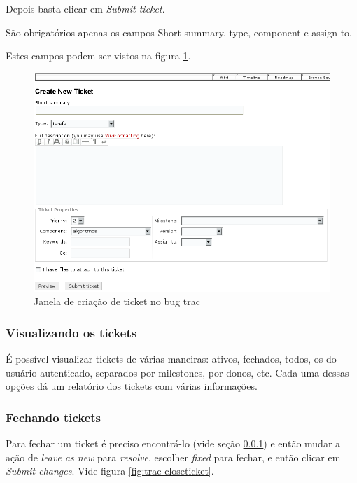 \documentclass[12pt,brazil]{book}
\newcommand{\eng}[1]{\textit{#1}}
\begin{document}
Depois basta clicar em \eng{Submit ticket}.

São obrigatórios apenas os campos Short summary, type, component e
assign to.

Estes campos podem ser vistos na figura \ref{fig:trac-newticket}.

\begin{figure}
  \centering
  \includegraphics[scale=.7]{trac-newticket}
  \caption{Janela de criação de ticket no bug trac}
  \label{fig:trac-newticket}
\end{figure}

\subsubsection{Visualizando os tickets}
\label{sec:visu-os-tick}

É possível visualizar tickets de várias maneiras: ativos, fechados,
todos, os do usuário autenticado, separados por milestones, por donos,
etc. Cada uma dessas opções dá um relatório dos tickets com várias
informações.

\subsubsection{Fechando tickets}
\label{sec:fechando-tickets}

Para fechar um ticket é preciso encontrá-lo (vide seção
\ref{sec:visu-os-tick}) e então mudar a ação de \eng{leave as new}
para \eng{resolve}, escolher \eng{fixed} para fechar, e então clicar
em \eng{Submit changes}. Vide figura \ref{fig:trac-closeticket}.
\end{document}
